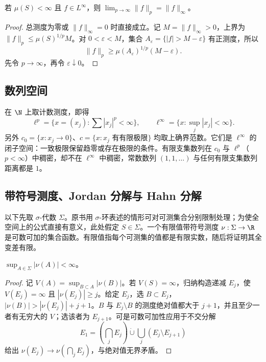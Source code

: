 \begin{proposition}[有限测度空间上的极限]
若 $\mu(S)<\infty$ 且 $f\in L^\infty$，则 $\lim_{p\to\infty}\|f\|_p=\|f\|_\infty$。
\end{proposition}
\begin{proof}
总测度为零或 $\|f\|_\infty=0$ 时直接成立。记 $M=\|f\|_\infty>0$，上界为 $\|f\|_p\le\mu(S)^{1/p}M$。对 $0<\varepsilon<M$，集合 $A_\varepsilon=\{|f|>M-\varepsilon\}$ 有正测度，所以
\[
 \|f\|_p\ge\mu(A_\varepsilon)^{1/p}(M-\varepsilon).
\]
先令 $p\to\infty$，再令 $\varepsilon\downarrow0$。
\end{proof}

\subsection{数列空间}
在 $\N$ 上取计数测度，即得
\[
 \ell^p=\{x=(x_j):\sum|x_j|^p<\infty\},\qquad
 \ell^\infty=\{x:\sup_j|x_j|<\infty\}.
\]
另外 $c_0=\{x:x_j\to0\}$、$c=\{x:x_j\text{ 有有限极限}\}$ 均取上确界范数。它们是 $\ell^\infty$ 的闭子空间：一致极限保留趋零或存在极限的条件。有限支集数列在 $c_0$ 与 $\ell^p$（$p<\infty$）中稠密，却不在 $\ell^\infty$ 中稠密，常数数列 $(1,1,\ldots)$ 与任何有限支集数列距离都是 $1$。

\subsection{带符号测度、Jordan 分解与 Hahn 分解}
以下先取 $\sigma$-代数 $\Sigma$。原书用 $\sigma$-环表述的情形可对可测集合分别限制处理；为使全空间上的公式直接有意义，此处假定 $S\in\Sigma$。一个有限值带符号测度 $\nu:\Sigma\to\R$ 是可数可加的集合函数。有限值指每个可测集的值都是有限实数，随后将证明其全变差有限。

\begin{lemma}[有限值带符号测度的值域有界]\label{lem:y1-measure-bounded}
$\sup_{A\in\Sigma}|\nu(A)|<\infty$。
\end{lemma}
\begin{proof}
记 $V(A)=\sup_{B\subset A}|\nu(B)|$。若 $V(S)=\infty$，归纳构造递减 $E_j$，使 $V(E_j)=\infty$ 且 $|\nu(E_j)|\ge j$。给定 $E_j$，选 $B\subset E_j$，$|\nu(B)|>|\nu(E_j)|+j+1$。$B$ 与 $E_j\setminus B$ 的测度绝对值都大于 $j+1$，并且至少一者有无穷大的 $V$；选该者为 $E_{j+1}$。可是可数可加性应用于不交分解
\[
 E_1=\left(\bigcap_jE_j\right)\mathbin{\dot\cup}
 \bigcup_j(E_j\setminus E_{j+1})
\]
给出 $\nu(E_j)\to\nu(\bigcap_jE_j)$，与绝对值无界矛盾。
\end{proof}

